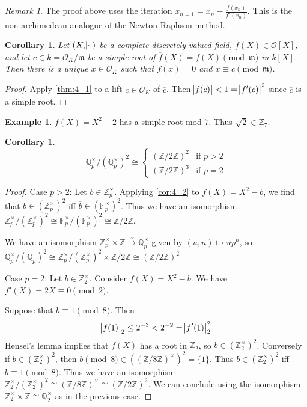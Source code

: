 \documentclass[11pt]{article}
\theoremstyle{definition}
\newtheorem*{example}{Example}
\theoremstyle{plain}
\newtheorem{corollary}[definition]{Corollary}
\theoremstyle{remark}
\newtheorem*{remark}{Remark}
\newcommand{\FF}{\mathbb{F}}
\newcommand{\ZZ}{\mathbb{Z}}
\newcommand{\QQ}{\mathbb{Q}}
\newcommand{\cO}{\mathcal{O}}
\newcommand{\fm}{\mathfrak{m}}
\begin{document}
\begin{remark}
    The proof above uses the iteration $x_{n=1} = x_n - \frac{f(x_n)}{f'(x_n)}$. This is the non-archimedean analogue of the Newton-Raphson method.
\end{remark}

\begin{corollary}\label{cor:4_2}
    Let $(K, \abs{\cdot})$ be a complete discretely valued field, $f(X) \in \cO[X]$, and let $\overline{c} \in k = \cO_K / \fm$ be a simple root of $\overline{f}(X) = f(X) \pmod{\fm}$ in $k[X]$. Then there is a unique $x \in \cO_K$ such that $f(x) = 0$ and $x \equiv \overline{c} \pmod{\fm}$.
\end{corollary}
\begin{proof}
    Apply \autoref{thm:4_1} to a lift $c \in \cO_K$ of $\overline{c}$. Then $\abs{f(c)} < 1 = \abs{f'(c)}^2$ since $\overline{c}$ is a simple root.
\end{proof}

\begin{example}
    $f(X) = X^2 - 2$ has a simple root mod $7$. Thus $\sqrt{2} \in \ZZ_7$.
\end{example}

\begin{corollary}\label{cor:4_3}
    \begin{equation*}
        \QQ_p^\times / (\QQ_p^\times)^2 \cong
        \begin{cases}
            (\ZZ / 2 \ZZ)^2 & \text{if } p > 2\\
            (\ZZ / 2 \ZZ)^3 & \text{if } p = 2
        \end{cases}
    \end{equation*}
\end{corollary}
\begin{proof}
    Case $p > 2$: Let $b \in \ZZ_p^\times$. Applying \autoref{cor:4_2} to $f(X) = X^2 - b$, we find that $b \in (\ZZ_p^\times)^2$ iff $\overline{b} \in (\FF_p^\times)^2$. Thus we have an isomorphism $\ZZ_p^\times / (\ZZ_p^\times)^2 \cong \FF_p^\times / (\FF_p^\times)^2 \cong \ZZ / 2\ZZ$.

    We have an isomorphism $\ZZ_p^\times \times \ZZ \xrightarrow{\sim} \QQ_p^\times$ given by $(u, n) \mapsto u p^n$, so $\QQ_p^\times / (\QQ_p)^2 \cong \ZZ_p^\times / (\ZZ_p^\times)^2 \times \ZZ / 2\ZZ \cong (\ZZ / 2\ZZ)^2$

    Case $p = 2$: Let $b \in \ZZ_2^\times$. Consider $f(X) = X^2 - b$. We have $f'(X) = 2X \equiv 0 \pmod{2}$.

    Suppose that $b \equiv 1 \pmod{8}$. Then
    \begin{equation*}
        \abs{f(1)}_2 \le 2^{-3} < 2^{-2} = \abs{f'(1)}_2^2
    \end{equation*}
    Hensel's lemma implies that $f(X)$ has a root in $\ZZ_2$, so $b \in (\ZZ_2^\times)^2$. Conversely if $b \in (\ZZ_2^\times)^2$, then $b \pmod{8} \in ((\ZZ / 8\ZZ)^\times)^2 = \{1\}$. Thus $b \in (\ZZ_2^\times)^2$ iff $b \equiv 1 \pmod{8}$. Thus we have an isomorphism $\ZZ_2^\times / (\ZZ_2^\times)^2 \cong (\ZZ / 8 \ZZ)^\times \cong (\ZZ / 2\ZZ)^2$. We can conclude using the isomorphism $\ZZ_2^\times \times \ZZ \cong \QQ_2^\times$ as in the previous case.
\end{proof}
\end{document}

